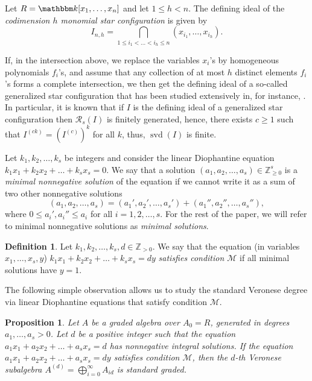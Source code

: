 \documentclass[12pt]{amsart}
\numberwithin{equation}{section}
\newtheorem{proposition}[theorem]{Proposition}
\theoremstyle{definition}
\newtheorem{definition}[theorem]{Definition}
\DeclareMathOperator{\svd}{svd}
\newcommand{\ZZ}{{\mathbb Z}}
\newcommand{\kk}{{\mathbbm k}}
\def\R{{\mathcal R}}
\def\R{{\mathcal R}}
\begin{document}
\vspace{0.5em}

Let $R = \kk[x_1, \dots, x_n]$ and let $1\le h < n$. The defining ideal of the \textit{codimension $h$ monomial star configuration} is given by
	$$I_{n,h} = \bigcap_{1 \le i_1 < \dots < i_h \le n} (x_{i_1}, \dots, x_{i_h}).$$

If, in the intersection above, we replace the variables $x_i$'s by homogeneous polynomials $f_i$'s, and assume that any collection of at most $h$ distinct elements $f_i$'s forms a complete intersection, we then get the defining ideal of a so-called generalized star configuration that has been studied extensively in, for instance, \cite{Mantero, LinShen, GHMN17}. In particular, it is known that if $I$ is the defining ideal of a generalized star configuration then $\R_s(I)$ is finitely generated, hence, there exists $c\ge 1$ such that $I^{(ck)}=(I^{(c)})^k$ for all $k$, thus, $\svd(I)$ is finite.\par

\vspace{0.5em}

Let $k_1,k_2,\ldots, k_s$ be integers and consider the linear Diophantine equation $k_1x_1+k_2x_2+\ldots +k_sx_s=0$. We say that a solution $(a_1,a_2,\ldots,a_s) \in \ZZ_{\ge 0}^s$ is a \textit{minimal nonnegative solution} of the equation if we cannot write it as a sum of two other nonnegative solutions 
\[
(a_1,a_2,\ldots,a_s) = (a_1',a_2',\ldots,a_s') + (a_1'',a_2'',\ldots,a_s''),
\]
where $0\le a_i', a_i'' \le a_i$ for all $i=1,2,\ldots,s$. For the rest of the paper, we will refer to minimal nonnegative solutions as \textit{minimal solutions}. 


\begin{definition}
    \label{def.condM}
    Let $k_1,k_2,\ldots,k_s,d \in \ZZ_{>0}$. We say that the equation (in variables $x_1,\ldots,x_s, y$) $k_1x_1+k_2x_2+\ldots +k_sx_s = dy$ \textit{satisfies condition $\mathcal{M}$} if all minimal solutions have $y=1$.
\end{definition}

The following simple observation allows us to study the standard Veronese degree via linear Diophantine equations that satisfy condition $\mathcal{M}$.

\begin{proposition}
    \label{prop.SVDandMinSol}
    Let $A$ be a graded algebra over $A_0=R$, generated in degrees $a_1,\ldots, a_s >0$. Let $d$ be a positive integer such that the equation $a_1x_1+a_2x_2+\ldots +a_sx_s = d$ has nonnegative integral solutions. If the equation $a_1x_1+a_2x_2+\ldots +a_sx_s = dy$ satisfies condition $\mathcal{M}$, then the $d$-th Veronese subalgebra $A^{(d)}=\bigoplus_{i=0}^\infty A_{id}$ is standard graded.
\end{proposition}
\end{document}
